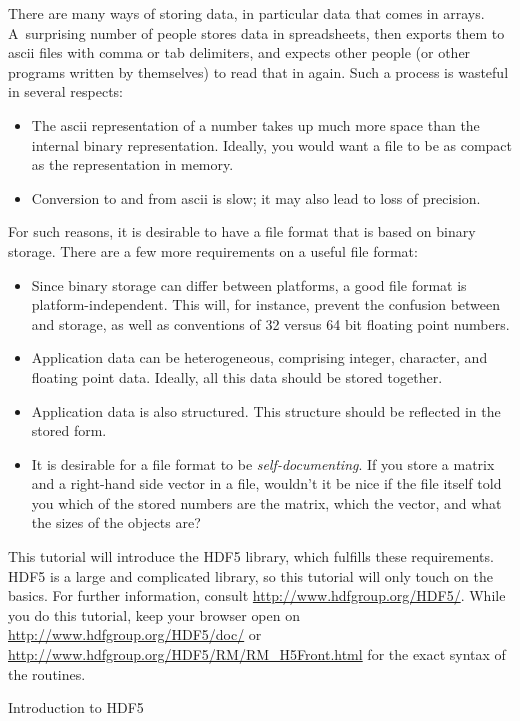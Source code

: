 There are many ways of storing data, in particular data that comes in
arrays. A~surprising number of people stores data in spreadsheets,
then exports them to ascii files with comma or tab delimiters, and expects other
people (or other programs written by themselves) to read that in
again. Such a process is wasteful in several respects:
\begin{itemize}
\item The ascii representation of a number takes up much more space
  than the internal binary representation. Ideally, you would want a
  file to be as compact as the representation in memory.
\item Conversion to and from ascii is slow; it may also lead to loss
  of precision.
\end{itemize}
For such reasons, it is desirable to have a file format that is based
on binary storage. There are a few more requirements on a useful file
format:
\begin{itemize}
\item Since binary storage can differ between platforms, a good file
  format is platform-independent. This will, for instance, prevent the
  confusion between  and
   storage, as well as conventions of 32
  versus 64 bit floating point numbers.  
\item Application data can be heterogeneous, comprising integer,
  character, and floating point data. Ideally, all this data should be
  stored together.
\item Application data is also structured. This structure should be
  reflected in the stored form.
\item It is desirable for a file format to be
  \emph{self-documenting}. If you store a matrix and a right-hand side
  vector in a file, wouldn't it be nice if the file itself told you
  which of the stored numbers are the matrix, which the vector, and
  what the sizes of the objects are?
\end{itemize}
This tutorial will introduce the HDF5 library, which fulfills these
requirements. HDF5 is a large and complicated library, so this
tutorial will only touch on the basics. For
further information, consult \url{http://www.hdfgroup.org/HDF5/}.
While you do this tutorial, keep your browser open on
\url{http://www.hdfgroup.org/HDF5/doc/} or
\url{http://www.hdfgroup.org/HDF5/RM/RM_H5Front.html} 
for the exact
syntax of the routines.

 {Introduction to HDF5}

